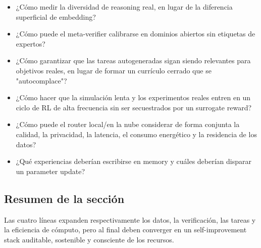 \begin{itemize}
    \item ¿Cómo medir la diversidad de reasoning real, en lugar de la diferencia superficial de embedding?
    \item ¿Cómo puede el meta-verifier calibrarse en dominios abiertos sin etiquetas de expertos?
    \item ¿Cómo garantizar que las tareas autogeneradas sigan siendo relevantes para objetivos reales, en lugar de formar un currículo cerrado que se "autocomplace"?
    \item ¿Cómo hacer que la simulación lenta y los experimentos reales entren en un ciclo de RL de alta frecuencia sin ser secuestrados por un surrogate reward?
    \item ¿Cómo puede el router local/en la nube considerar de forma conjunta la calidad, la privacidad, la latencia, el consumo energético y la residencia de los datos?
    \item ¿Qué experiencias deberían escribirse en memory y cuáles deberían disparar un parameter update?
\end{itemize}

\subsection{Resumen de la sección}

Las cuatro líneas expanden respectivamente los datos, la verificación, las tareas y la eficiencia de cómputo, pero al final deben converger en un self-improvement stack auditable, sostenible y consciente de los recursos.
